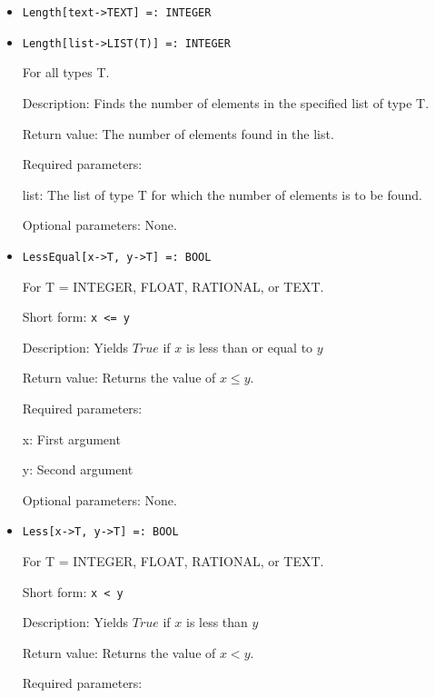 \begin{itemize}
\item
\protect \large \begin{verbatim}
Length[text->TEXT] =: INTEGER
\end{verbatim}\normalsize

\item
\protect \large \begin{verbatim}
Length[list->LIST(T)] =: INTEGER
\end{verbatim}\normalsize
For all types T.

\bd
\item
[Description:] Finds the number of elements in the specified list of
type T.
\item
[Return value:] The number of elements found in the list.
\item
[Required parameters:]\hfil\null

\bd
\item
[list:] The list of type T for which the number of elements is to be
found.
\ed

\item
[Optional parameters:] None.
\ed

\item
\protect \large \begin{verbatim}
LessEqual[x->T, y->T] =: BOOL
\end{verbatim}\normalsize

For T = INTEGER, FLOAT, RATIONAL, or TEXT.

\bd
\item
[Short form:] \verb+x <= y+
\item
[Description:] Yields $True$ if $x$ is less than or equal to $y$
\item
[Return value:] Returns the value of $x \leq y$.
\item
[Required parameters:]\hfil\null

\bd
\item
[x:] First argument
\item
[y:] Second argument
\ed

\item
[Optional parameters:] None.
\ed

\item
\protect \large \begin{verbatim}
Less[x->T, y->T] =: BOOL
\end{verbatim}\normalsize

For T = INTEGER, FLOAT, RATIONAL, or TEXT.

\bd
\item
[Short form:] \verb+x < y+
\item
[Description:] Yields $True$ if $x$ is less than $y$
\item
[Return value:] Returns the value of $x < y$.
\item
[Required parameters:]\hfil\null


\end{itemize}
